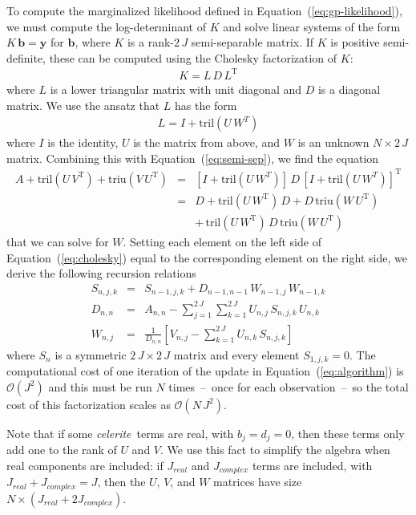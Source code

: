 \documentclass[manuscript, letterpaper]{aastex6}
\newcommand{\celeriteterm}{\emph{celerite}}
\renewcommand{\eqref}[1]{\ref{eq:#1}}
\newcommand{\Eq}[1]{Equation~(\eqref{#1})}
\newcommand{\eq}[1]{\Eq{#1}}
\newcommand{\eqlabel}[1]{\label{eq:#1}}
\newcommand{\T}{\ensuremath{\mathrm{T}}}
\newcommand{\bvec}[1]{{\ensuremath{\boldsymbol{#1}}}}
\begin{document}
To compute the marginalized likelihood defined in \eq{gp-likelihood}, we must
compute the log-determinant of $K$ and solve linear systems of the form
$K\,\bvec{b}=\bvec{y}$ for $\bvec{b}$, where $K$ is a rank-$2\,J$
semi-separable matrix.
If $K$ is positive semi-definite, these can be computed using the Cholesky
factorization of $K$:
\begin{eqnarray}
K = L\,D\,L^\T
\end{eqnarray}
where $L$ is a lower triangular matrix with unit diagonal and $D$ is a
diagonal matrix.
We use the ansatz that $L$ has the form
\begin{eqnarray}
    L = I + \mathrm{tril} (U\,W^T)
\end{eqnarray}
where $I$ is the identity, $U$ is the matrix from above, and $W$ is an unknown
$N \times 2\,J$ matrix.
Combining this with \eq{semi-sep}, we find the equation
\begin{eqnarray}\eqlabel{cholesky}
A + \mathrm{tril}(U\,V^\T) + \mathrm{triu}(V\,U^\T)
&=& \left[I + \mathrm{tril} (U\,W^T)\right]\,D\,
    {\left[I + \mathrm{tril} (U\,W^T)\right]}^\T \\
&=& D + \mathrm{tril}(U\,W^\T)\,D
    + D\,\mathrm{triu}(W\,U^\T) \nonumber\\
&& +\, \mathrm{tril}(U\,W^\T)\,D\,\mathrm{triu}(W\,U^\T) \nonumber
\end{eqnarray}
that we can solve for $W$.
Setting each element on the left side of \eq{cholesky} equal to the
corresponding element on the right side, we derive the following recursion
relations
\begin{eqnarray}
S_{n,j,k} &=& S_{n-1,j,k} + D_{n-1,n-1}\,W_{n-1,j}\,W_{n-1,k} \nonumber\\
D_{n,n} &=& A_{n,n} -
    \sum_{j=1}^{2\,J}\sum_{k=1}^{2\,J} U_{n,j}\,S_{n,j,k}\,U_{n,k}
    \nonumber\\
W_{n,j} &=& \frac{1}{D_{n,n}}\left[ V_{n,j} -
    \sum_{k=1}^{2\,J}U_{n,k}\,S_{n,j,k} \right]
    \eqlabel{algorithm}
\end{eqnarray}
where $S_n$ is a symmetric $2\,J \times 2\,J$ matrix and every element
$S_{1,j,k}=0$.
The computational cost of one iteration of the update in \eq{algorithm} is
$\mathcal{O}(J^2)$ and this must be run $N$ times~--~once for each
observation~--~so the total cost of this factorization scales as
$\mathcal{O}(N\,J^2)$.

Note that if some \celeriteterm\ terms are real, with $b_j=d_j=0$,
then these terms only add one to the rank of $U$ and $V$.  We use this fact
to simplify the algebra when real components are included:  if $J_{real}$
and $J_{complex}$ terms are included, with $J_{real}+J_{complex}=J$, then
the $U$, $V$, and $W$ matrices have size $N \times (J_{real}+2J_{complex})$.
\end{document}
